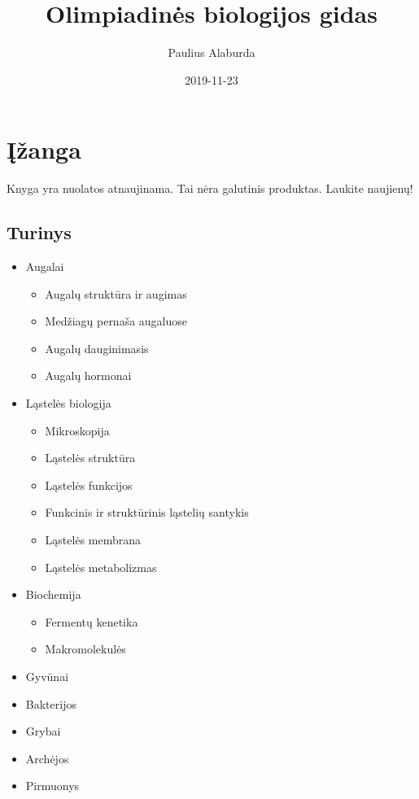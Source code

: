 \documentclass[]{book}
\title{Olimpiadinės biologijos gidas}
\author{Paulius Alaburda}
\date{2019-11-23}
\providecommand{\tightlist}{%
  \setlength{\itemsep}{0pt}\setlength{\parskip}{0pt}}
\begin{document}
\maketitle

{
\setcounter{tocdepth}{1}
\tableofcontents
}
\hypertarget{izanga}{%
\chapter{Įžanga}\label{izanga}}

Knyga yra nuolatos atnaujinama. Tai nėra galutinis produktas. Laukite naujienų!

\hypertarget{turinys}{%
\section{Turinys}\label{turinys}}

\begin{itemize}
\tightlist
\item
  Augalai

  \begin{itemize}
  \tightlist
  \item
    Augalų struktūra ir augimas
  \item
    Medžiagų pernaša augaluose
  \item
    Augalų dauginimasis
  \item
    Augalų hormonai
  \end{itemize}
\item
  Ląstelės biologija

  \begin{itemize}
  \tightlist
  \item
    Mikroskopija
  \item
    Ląstelės struktūra
  \item
    Ląstelės funkcijos
  \item
    Funkcinis ir struktūrinis ląstelių santykis
  \item
    Ląstelės membrana
  \item
    Ląstelės metabolizmas
  \end{itemize}
\item
  Biochemija

  \begin{itemize}
  \tightlist
  \item
    Fermentų kenetika
  \item
    Makromolekulės
  \end{itemize}
\item
  Gyvūnai
\item
  Bakterijos
\item
  Grybai
\item
  Archėjos
\item
  Pirmuonys
\end{itemize}
\end{document}
